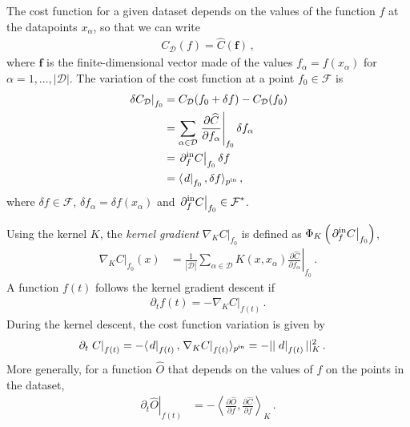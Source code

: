 \documentclass[11pt]{article}
\begin{document}
The cost function for a given dataset depends on the values of the function 
$f$ at the datapoints $x_{\alpha}$, so that we can write
\begin{align}
    C_{\mathcal{D}}(f) = \widehat{C}(\mathbf{f})\, ,
\end{align}
where $\mathbf{f}$ is the finite-dimensional vector made of the 
values $f_{\alpha}=f(x_{\alpha})$ for $\alpha=1, \ldots, |\mathcal{D}|$.
The variation of the cost function at a point $f_0 \in \mathcal{F}$ is
\begin{align}
    \left. \delta C_{\mathcal{D}} \right|_{f_0} 
        &= C_{\mathcal{D}}(f_0+\delta f) - C_{\mathcal{D}}(f_0) \\
        &= \sum_{\alpha\in\mathcal{D}} 
            \left. \frac{\partial \widehat{C}}{\partial f_\alpha} \right|_{f_0} 
            \delta f_{\alpha} \\
        &= \left. \partial^{\text{in}}_{f} C \right|_{f_0} \delta f \\
        &= \langle \left. d\right|_{f_0}, \delta f\rangle_{p^{\text{in}}}\, ,
\end{align}
where $\delta f \in \mathcal{F}$, $\delta f_{\alpha}=\delta f(x_{\alpha})$ and 
$\displaystyle \left. \partial^{\text{in}}_{f} C \right|_{f_0} \in \mathcal{F}^*$.

Using the kernel $K$, the {\em kernel gradient} $\left.\nabla_K C\right|_{f_0}$
is defined as 
$\displaystyle \Phi_K\left(\left. \partial^{\text{in}}_{f} C \right|_{f_0}
\right)$, \ie 
\begin{align}
    \label{eq:KernGradC}
    \left.\nabla_K C\right|_{f_0}(x)
        &= \frac{1}{|\mathcal{D}|} \sum_{\alpha\in\mathcal{D}} 
            K(x,x_{\alpha}) \left. 
            \frac{\partial \widehat{C}}{\partial f_\alpha}\right|_{f_0}\, .
\end{align}
A function $f(t)$ follows the kernel gradient descent if 
\begin{align}
    \partial_{t} f(t) = -\left.\nabla_{K} C\right|_{f(t)}\,.
\end{align}
During the kernel descent, the cost function variation is given by
\begin{align}
    \partial_{t} \left. C\right|_{f(t)}
        &= - \langle \left. d \right|_{f(t)}, \left.\nabla_{K} C\right|_{f(t)} \rangle_{p^{\text{in}}} = 
        -|| \left. d \right|_{f(t)} ||^2_{K}\, .
\end{align}
More generally, for a function $\widehat{O}$ that depends on 
the values of $f$ on the points in the dataset, 
\begin{align}
    \partial_{t} \left. \widehat{O}\right|_{f(t)}
        &= - \left\langle 
            \frac{\partial \widehat{O}}{\partial f}, 
            \frac{\partial \widehat{C}}{\partial f} 
            \right\rangle_K\, .
\end{align}
\end{document}
